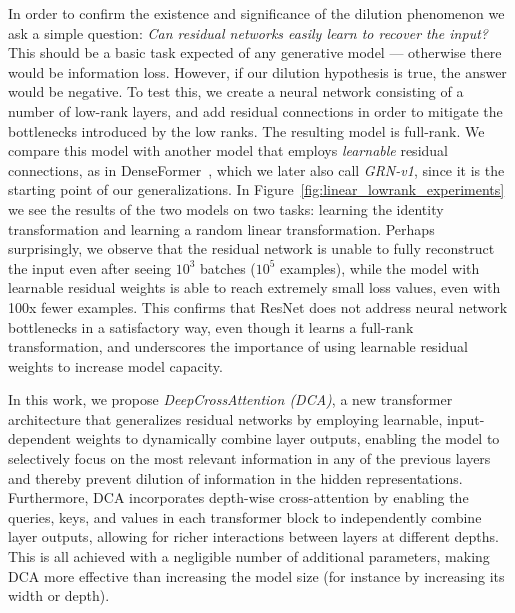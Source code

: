 In order to confirm the existence and significance of the dilution phenomenon we ask a simple question: 
\emph{Can residual networks easily learn to recover the input?}
This should be a basic task expected of any generative
model --- otherwise there would be information loss. However,
if our dilution hypothesis is true, the answer would be negative.
To test this, we create a neural network consisting of a
number of low-rank layers, and add residual connections in order to
mitigate the bottlenecks introduced by the low ranks. The resulting
model is full-rank. We compare this model with another model that 
employs \emph{learnable} residual
connections, as in DenseFormer~\cite{pagliardini2024denseformer},
which we later also call \emph{GRN-v1}, since it is the starting point
of our generalizations. In Figure~\ref{fig:linear_lowrank_experiments} we see the results of the two models on two tasks: 
learning the identity transformation and learning a random
linear transformation.
Perhaps surprisingly, we observe that the 
residual network is unable to fully reconstruct the input even after
seeing $10^3$ batches ($10^5$ examples),
while the model with learnable residual
weights is able to reach extremely small loss values, even
with 100x fewer examples. This confirms that ResNet does not address
neural network bottlenecks in a satisfactory way, even though it learns a full-rank transformation, and underscores the importance of
using learnable residual weights to increase model capacity.


 In this work, we propose \emph{DeepCrossAttention (DCA)}, a new
transformer architecture that generalizes residual networks by employing learnable, input-dependent weights to dynamically combine layer outputs, enabling the model to selectively focus on the most relevant information in any of the previous layers and thereby prevent dilution of information in the hidden representations. 
Furthermore, DCA incorporates depth-wise cross-attention by enabling the queries, keys, and values in each transformer block to independently combine layer outputs, allowing for richer interactions between layers at different depths.
This is all achieved with a negligible number of additional parameters, making DCA more effective than increasing the model size (for instance by increasing its width or depth).


